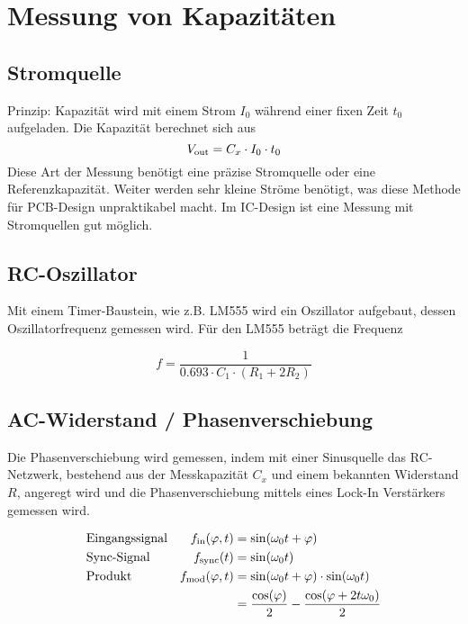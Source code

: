 \section{Messung von Kapazitäten}

\subsection{Stromquelle}
Prinzip: Kapazität wird mit einem Strom $I_0$ während einer fixen Zeit 
$t_0$ aufgeladen. Die Kapazität berechnet sich aus
\begin{equation*}
	V_{\operatorname{\text{out}}} = C_x \cdot I_0 \cdot t_0
\end{equation*}
Diese Art der Messung benötigt eine präzise Stromquelle oder eine
Referenzkapazität. Weiter werden sehr kleine Ströme benötigt, was
diese Methode für PCB-Design unpraktikabel macht. Im IC-Design
ist eine Messung mit Stromquellen gut möglich.

\subsection{RC-Oszillator}
Mit einem Timer-Baustein, wie z.B. LM555 wird ein Oszillator aufgebaut,
dessen Oszillatorfrequenz gemessen wird. Für den LM555 beträgt die Frequenz

\begin{equation*}
	f = \frac{1}{0.693 \cdot C_1 \cdot (R_1 + 2 R_2) }
\end{equation*}

\subsection{AC-Widerstand / Phasenverschiebung}
Die Phasenverschiebung wird gemessen, indem mit einer Sinusquelle das RC-Netzwerk,
bestehend aus der Messkapazität $C_x$ und einem bekannten Widerstand $R$,
angeregt wird und die Phasenverschiebung mittels eines Lock-In Verstärkers
gemessen wird.

\begin{align*}
	& \text{Eingangssignal} & f_{\operatorname{\text{in}}}(\varphi,t) &= \sin(\omega_0 t + \varphi) \\
	& \text{Sync-Signal} & f_{\text{sync}}(t) &= \sin(\omega_0 t) \\
	& \text{Produkt} & f_{\text{mod}}(\varphi,t) &= \sin(\omega_0 t + \varphi) \cdot \sin(\omega_0 t) \\
	& & &= \frac{\cos(\varphi)}{2} - \frac{\cos(\varphi + 2 t \omega_0)}{2}
\end{align*}

